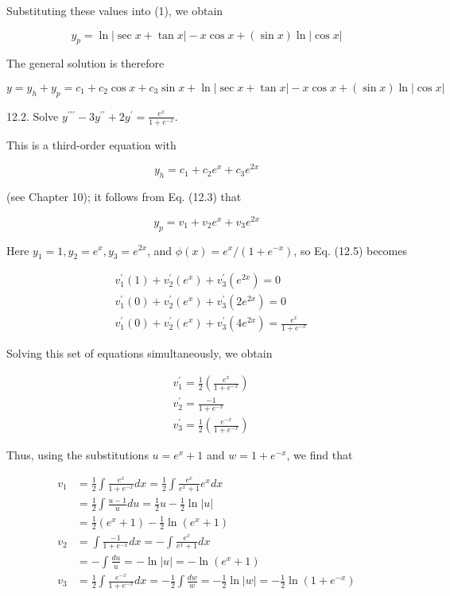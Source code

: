 \documentclass[10pt]{article}
\begin{document}
Substituting these values into (1), we obtain

$$
y_{p}=\ln |\sec x+\tan x|-x \cos x+(\sin x) \ln |\cos x|
$$

The general solution is therefore

$$
y=y_{h}+y_{p}=c_{1}+c_{2} \cos x+c_{3} \sin x+\ln |\sec x+\tan x|-x \cos x+(\sin x) \ln |\cos x|
$$

12.2. Solve $y^{\prime \prime \prime}-3 y^{\prime \prime}+2 y^{\prime}=\frac{e^{x}}{1+e^{-x}}$.

This is a third-order equation with

$$
y_{h}=c_{1}+c_{2} e^{x}+c_{3} e^{2 x}
$$

(see Chapter 10); it follows from Eq. (12.3) that


\begin{equation*}
y_{p}=v_{1}+v_{2} e^{x}+v_{3} e^{2 x} \tag{1}
\end{equation*}


Here $y_{1}=1, y_{2}=e^{x}, y_{3}=e^{2 x}$, and $\phi(x)=e^{x} /\left(1+e^{-x}\right)$, so Eq. (12.5) becomes

$$
\begin{aligned}
& v_{1}^{\prime}(1)+v_{2}^{\prime}\left(e^{x}\right)+v_{3}^{\prime}\left(e^{2 x}\right)=0 \\
& v_{1}^{\prime}(0)+v_{2}^{\prime}\left(e^{x}\right)+v_{3}^{\prime}\left(2 e^{2 x}\right)=0 \\
& v_{1}^{\prime}(0)+v_{2}^{\prime}\left(e^{x}\right)+v_{3}^{\prime}\left(4 e^{2 x}\right)=\frac{e^{x}}{1+e^{-x}}
\end{aligned}
$$

Solving this set of equations simultaneously, we obtain

$$
\begin{aligned}
& v_{1}^{\prime}=\frac{1}{2}\left(\frac{e^{x}}{1+e^{-x}}\right) \\
& v_{2}^{\prime}=\frac{-1}{1+e^{-x}} \\
& v_{3}^{\prime}=\frac{1}{2}\left(\frac{e^{-x}}{1+e^{-x}}\right)
\end{aligned}
$$

Thus, using the substitutions $u=e^{x}+1$ and $w=1+e^{-x}$, we find that

$$
\begin{aligned}
v_{1} & =\frac{1}{2} \int \frac{e^{x}}{1+e^{-x}} d x=\frac{1}{2} \int \frac{e^{x}}{e^{x}+1} e^{x} d x \\
& =\frac{1}{2} \int \frac{u-1}{u} d u=\frac{1}{2} u-\frac{1}{2} \ln |u| \\
& =\frac{1}{2}\left(e^{x}+1\right)-\frac{1}{2} \ln \left(e^{x}+1\right) \\
v_{2} & =\int \frac{-1}{1+e^{-x}} d x=-\int \frac{e^{x}}{e^{x}+1} d x \\
& =-\int \frac{d u}{u}=-\ln |u|=-\ln \left(e^{x}+1\right) \\
v_{3} & =\frac{1}{2} \int \frac{e^{-x}}{1+e^{-x}} d x=-\frac{1}{2} \int \frac{d w}{w}=-\frac{1}{2} \ln |w|=-\frac{1}{2} \ln \left(1+e^{-x}\right)
\end{aligned}
$$
\end{document}
